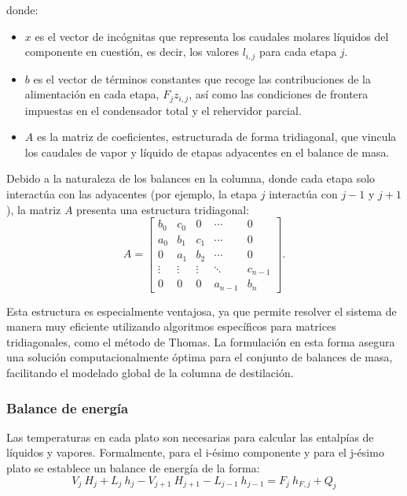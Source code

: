donde:
\begin{itemize}
    \item $x$ es el vector de incógnitas que representa los caudales molares líquidos del componente en cuestión, es decir, los valores $l_{i,j}$ para cada etapa $j$.
    \item $b$ es el vector de términos constantes que recoge las contribuciones de la alimentación en cada etapa, $F_j z_{i,j}$, así como las condiciones de frontera impuestas en el condensador total y el rehervidor parcial.
    \item $A$ es la matriz de coeficientes, estructurada de forma tridiagonal, que vincula los caudales de vapor y líquido de etapas adyacentes en el balance de masa.
\end{itemize}

Debido a la naturaleza de los balances en la columna, donde cada etapa solo interactúa con las adyacentes (por ejemplo, la etapa $j$ interactúa con $j-1$ y $j+1$), la matriz $A$ presenta una estructura tridiagonal:
$$
    A = \begin{bmatrix}
        b_0    & c_0    & 0      & \cdots  & 0       \\
        a_0    & b_1    & c_1    & \cdots  & 0       \\
        0      & a_1    & b_2    & \cdots  & 0       \\
        \vdots & \vdots & \vdots & \ddots  & c_{n-1} \\
        0      & 0      & 0      & a_{n-1} & b_n
    \end{bmatrix}.
$$

Esta estructura es especialmente ventajosa, ya que permite resolver el sistema de manera muy eficiente utilizando algoritmos específicos para matrices tridiagonales, como el método de Thomas. La formulación en esta forma asegura una solución computacionalmente óptima para el conjunto de balances de masa, facilitando el modelado global de la columna de destilación.

\newpage
\subsubsection{Balance de energía}
Las temperaturas en cada plato son necesarias para calcular las entalpías de líquidos y vapores. Formalmente, para el i-ésimo componente y para el j-ésimo plato se establece un balance de energía de la forma:
$$
    V_{j}\ H_j + L_{j}\ h_j - V_{j+1}\ H_{j+1} - L_{j-1}\ h_{j-1} = F_{j}\ h_{F,j} + Q_j
$$

